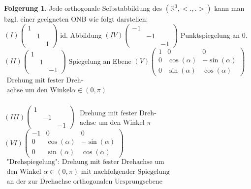 \documentclass[10pt,a4paper,numbers=endperiod]{scrartcl}
\theoremstyle{definition}
\newtheorem{folg}[satz]{Folgerung}
\def\RR{{\mathbb R}}
\begin{document}
\begin{folg}
	Jede orthogonale Selbstabbildung des $(\RR^3, <.,.>)$ kann man bzgl. einer geeigneten ONB wie folgt darstellen:\\

	$(I) \begin{pmatrix}
	1 & &\\
	& 1 &\\
	& & 1
	\end{pmatrix}$ id. Abbildung \hspace{3,4 cm }  $(IV) \begin{pmatrix}
	-1 & &\\
	& -1 &\\
	& & -1
	\end{pmatrix}$ Punktspiegelung an 0.\\
	$(II) \begin{pmatrix}
	1 & &\\
	& 1 &\\
	& & -1
	\end{pmatrix}$ Spiegelung an Ebene \hspace{2 cm} $(V) \begin{pmatrix}
	1 & 0 & 0\\
	0 & \cos (\alpha) & -\sin (\alpha)\\
	0 & \sin (\alpha) & \cos (\alpha)
	\end{pmatrix}$ 
	$\begin{matrix}
	\text{Drehung mit fester Dreh-}\\ 
	\text{achse um den Winkel} \alpha \in (0, \pi)\\ 
	\end{matrix}$\\
	
\begin{small}
	$(III) \begin{pmatrix}
	1 & &\\
	& -1 &\\
	& & -1
	\end{pmatrix}$ $\begin{matrix}
		\text{Drehung mit fester Dreh-}\\
		\text{achse um den Winkel } \pi
	\end{matrix}$   $(VI) \begin{pmatrix}
	-1 & 0 & 0\\
	0 & \cos (\alpha) & -\sin (\alpha)\\
	0 & \sin (\alpha) & \cos (\alpha)
	\end{pmatrix}$ $\begin{matrix}
		\text{"Drehspiegelung": Drehung mit fester Drehachse um}\\
		\text{den Winkel } \alpha \in (0, \pi) \text{ mit nachfolgender Spiegelung}\\
		\text{an der zur Drehachse orthogonalen Ursprungsebene}\\
	\end{matrix}$
\end{small}   
\end{folg}
\end{document}
